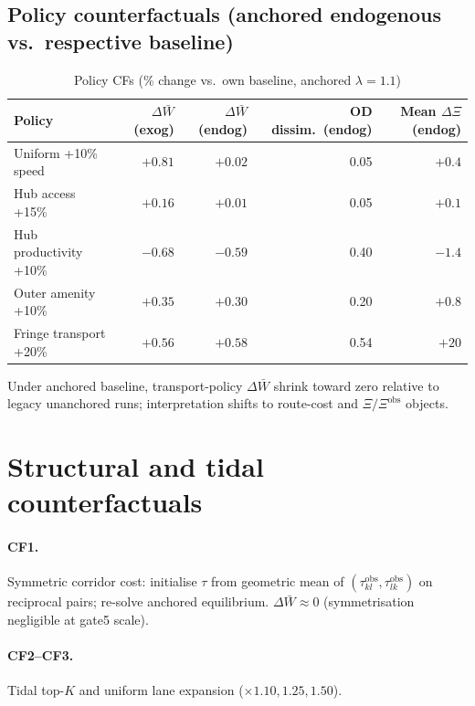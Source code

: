 \documentclass[12pt]{article}
\newcommand{\Wbar}{\bar W}
\newcommand{\obs}{\mathrm{obs}}
\begin{document}
\subsection{Policy counterfactuals (anchored endogenous vs.\ respective baseline)}

\begin{table}[htbp]
  \centering
  \caption{Policy CFs (\% change vs.\ own baseline, anchored $\lambda=1.1$)}
  \label{tab:policy}
  \small
  \begin{tabular}{lrrrr}
  \toprule
  Policy & $\Delta\Wbar$ (exog) & $\Delta\Wbar$ (endog) & OD dissim.\ (endog) &
    Mean $\Delta\Xi$ (endog) \\
  \midrule
  Uniform +10\% speed  & $+0.81$ & $+0.02$  & 0.05 & $+0.4$ \\
  Hub access +15\%     & $+0.16$ & $+0.01$  & 0.05 & $+0.1$ \\
  Hub productivity +10\% & $-0.68$ & $-0.59$ & 0.40 & $-1.4$ \\
  Outer amenity +10\%  & $+0.35$ & $+0.30$  & 0.20 & $+0.8$ \\
  Fringe transport +20\% & $+0.56$ & $+0.58$ & 0.54 & $+20$ \\
  \bottomrule
  \end{tabular}
\end{table}

Under anchored baseline, transport-policy $\Delta\Wbar$ shrink toward zero
relative to legacy unanchored runs; interpretation shifts to route-cost and
$\Xi/\Xi^{\obs}$ objects.

\section{Structural and tidal counterfactuals}\label{sec:structural}

\paragraph{CF1.} Symmetric corridor cost: initialise $\tau$ from geometric mean
of $(\tau^{\obs}_{kl},\tau^{\obs}_{lk})$ on reciprocal pairs; re-solve anchored
equilibrium. $\Delta\Wbar\approx 0$ (symmetrisation negligible at gate5 scale).

\paragraph{CF2--CF3.} Tidal top-$K$ and uniform lane expansion ($\times 1.10,1.25,1.50$).
\end{document}
